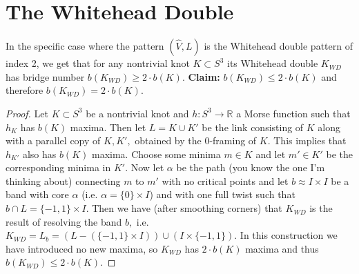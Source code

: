 \documentclass[11pt, oneside]{article}
\begin{document}
\section*{The Whitehead Double}
In the specific case where the pattern $(\hat{V}, L)$ is the Whitehead double pattern of index 2, we get that for any nontrivial knot $K \subset  S^{3}$ its Whitehead double $K_{WD}$ has bridge number $b(K_{WD}) \geq 2\cdot b(K).$ \textbf{Claim:} $b(K_{WD}) \leq 2\cdot b(K)$ and therefore $b(K_{WD}) = 2 \cdot b(K).$ \begin{proof} Let $K \subset S^{3}$ be a nontrivial knot and $h: S^{3} \rightarrow \mathbb{R}$ a Morse function such that $h_{K}$ has $b(K)$ maxima. Then let $L = K \cup K'$ be the link consisting of $K$ along with a parallel copy of $K, K',$ obtained by the 0-framing of $K.$ This implies that $h_{K'}$ also has $b(K)$ maxima. Choose some minima $m \in K$ and let $m' \in K'$ be the corresponding minima in $K'.$ Now let $\alpha$ be the path (you know the one I'm thinking about) connecting $m$ to $m'$ with no critical points and let $b \approx I \times I$ be a band with core $\alpha$ (i.e. $\alpha = \{0\} \times I$) and with one full twist such that $b \cap L = \{-1, 1\} \times I.$ Then we have (after smoothing corners) that $K_{WD}$ is the result of resolving the band $b,$ i.e. $K_{WD} = L_{b} =( L- (\{-1, 1\} \times I)) \cup (I \times \{-1, 1\}).$ In this construction we have introduced no new maxima, so $K_{WD}$ has $2 \cdot b(K)$ maxima and thus $b(K_{WD}) \leq 2 \cdot b(K).$

\end{proof}
\end{document}
